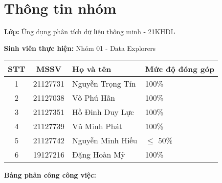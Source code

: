\section*{Thông tin nhóm}

\noindent
\textbf{Lớp:} Ứng dụng phân tích dữ liệu thông minh - 21KHDL


\noindent
\textbf{Sinh viên thực hiện:} Nhóm 01 - Data Explorers

\begin{table}[H]
\centering
\renewcommand{\arraystretch}{1.5}
\setlength{\tabcolsep}{8pt}
\begin{tabular}{|c|c|l|l|}
\hline
\textbf{STT} & \textbf{MSSV} & \textbf{Họ và tên} & \textbf{Mức độ đóng góp} \\ 
\hline
1 & 21127731 & Nguyễn Trọng Tín & 100\% \\
\hline
2 & 21127038 & Võ Phú Hãn & 100\% \\
\hline
3 & 21127351 & Hồ Đinh Duy Lực & 100\% \\
\hline
4 & 21127739 & Vũ Minh Phát & 100\% \\
\hline
5 & 21127742 & Nguyễn Minh Hiếu & $\leq$ 50\% \\
\hline
6 & 19127216 & Đặng Hoàn Mỹ & 100\% \\
\hline
\end{tabular}
\end{table}


\noindent
\textbf{Bảng phân công công việc:}

